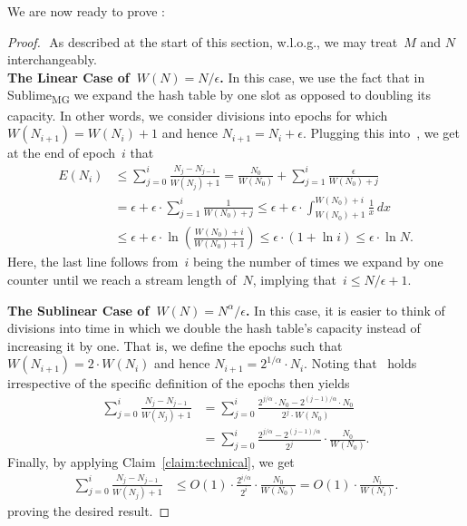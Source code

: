 \documentclass[sigconf]{acmart}
\newcommand{\sketch}{Sublime}
\newcommand{\sketchmg}{\sketch\textsubscript{MG}\xspace}
\newcommand{\parentheses}[1]{\left(#1\right)}
\begin{document}
\noindent
We are now ready to prove :
\thmmgnormal*
\begin{proof} ‌
    As described at the start of this section, w.l.o.g., we may treat~$M$ and $N$ interchangeably. \\
    \textbf{The Linear Case of~$W(N)=N/\epsilon$.} 
    In this case, we use the fact that in \sketchmg we expand the hash table by one slot as opposed to doubling its capacity.
    In other words, we consider divisions into epochs for which~$W(N_{i+1})=W(N_i)+1$ and hence $N_{i+1}=N_i+\epsilon$.
    Plugging this into~, we get at the end of epoch~$i$ that 
	\begin{align*}
		E(N_i)&\leq \sum_{j=0}^i  \frac{N_j - N_{j-1}}{W(N_j)+1} = \frac{N_0}{W(N_0)} + \sum_{j=1}^i  \frac{\epsilon}{W(N_0)+j} \\
		&= \epsilon + \epsilon \cdot \sum_{j=1}^i  \frac{1}{W(N_0)+j} \leq \epsilon + \epsilon \cdot \int_{W(N_0)+1}^{W(N_0)+i} \frac{1}{x} \,dx\\
		& \leq \epsilon + \epsilon \cdot \ln\parentheses{\frac{W(N_0)+i}{W(N_0)+1}} \leq \epsilon \cdot (1+\ln i) \leq \epsilon \cdot \ln N.
	\end{align*}
    Here, the last line follows from~$i$ being the number of times we expand by
    one counter until we reach a stream length of~$N$, implying that~$i \leq
    N/\epsilon+1$. 

    \medskip\noindent
    \textbf{The Sublinear Case of~$W(N)=N^{\alpha}/\epsilon$.}
    In this case, it is easier to think of divisions into time in which we double the hash table's capacity instead of increasing it by one.
    That is, we define the epochs such that~$W(N_{i+1}) = 2\cdot W(N_i)$ and hence $N_{i+1} = 2^{1/\alpha} \cdot N_i$.
    Noting that~ holds irrespective of the specific definition of the epochs then yields
    \begin{align*}
        \sum_{j=0}^i \frac{N_j - N_{j-1}}{W(N_j)+1} & = \sum_{j=0}^i \frac{2^{j/\alpha} \cdot N_0 - 2^{(j-1)/\alpha} \cdot N_0} {2^j \cdot W(N_0)} \\
        & = \sum_{j=0}^i  \frac{2^{j/\alpha}- 2^{(j-1)/\alpha}} {2^j} \cdot \frac{N_0}{W(N_0)}.
    \end{align*}
    Finally, by applying Claim~\ref{claim:technical}, we get
    \begin{align*}
        \sum_{j=0}^i \frac{N_j - N_{j-1}}{W(N_j)+1} & \leq  O(1) \cdot \frac{2^{i/\alpha}}{2^i} \cdot \frac{N_0}{W(N_0)} = O(1) \cdot \frac{N_i}{W(N_i)}.
    \end{align*}
    proving the desired result.
\end{proof}
\end{document}
